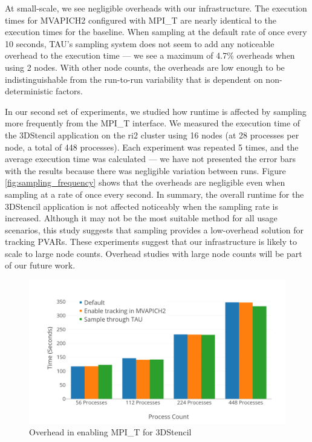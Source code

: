 \par At small-scale, we see negligible overheads with our infrastructure. The execution times for MVAPICH2 configured with MPI\_T are nearly identical to the execution times for the baseline. When sampling at the default rate of once every 10 seconds, TAU's sampling system does not seem to add any noticeable overhead to the execution time --- we see a maximum of 4.7\% overheads when using 2 nodes. With other node counts, the overheads are low enough to be indistinguishable from the run-to-run variability that is dependent on non-deterministic factors.\par In our second set of experiments, we studied how runtime is affected by sampling more frequently from the MPI\_T interface. We measured the execution time of the 3DStencil application on the ri2 cluster using 16 nodes (at 28 processes per node, a total of 448 processes). Each experiment was repeated 5 times, and the average execution time was calculated --- we have not presented the error bars with the results because there was negligible variation between runs. Figure \ref{fig:sampling_frequency} shows that the overheads are negligible even when sampling at a rate of once every second. In summary, the overall runtime for the 3DStencil application is not affected noticeably when the sampling rate is increased. Although it may not be the most suitable method for all usage scenarios, this study suggests that sampling provides a low-overhead solution for tracking PVARs. These experiments suggest that our infrastructure is likely to scale to large node counts. Overhead studies with large node counts will be part of our future work.
\begin{center}
        \begin{figure}[tbp!]
                 \includegraphics[width=\columnwidth,keepaspectratio,scale=1.0]{figures/MPI_T_Overheads}
                \captionsetup{justification=centering}
                  \caption{Overhead in enabling MPI\_T for 3DStencil}
                   \label{fig:overheads}
        \end{figure}
\end{center}



